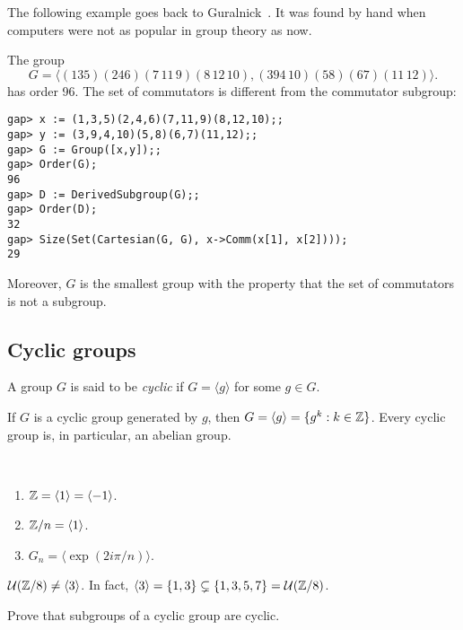 The following example goes back to Guralnick~\cite{MR673806}. 
It was found by hand when computers were not as popular
in group theory as now. 

\begin{example}
The group 
\[
G=\langle (135)(246)(7\,11\,9)(8\,12\,10),(394\,10)(58)(67)(11\,12)\rangle.
\]
has order 96. The set of commutators 
is different from the commutator subgroup:
\begin{lstlisting}
gap> x := (1,3,5)(2,4,6)(7,11,9)(8,12,10);;
gap> y := (3,9,4,10)(5,8)(6,7)(11,12);;
gap> G := Group([x,y]);;
gap> Order(G);
96
gap> D := DerivedSubgroup(G);;
gap> Order(D);
32
gap> Size(Set(Cartesian(G, G), x->Comm(x[1], x[2])));
29
\end{lstlisting}
Moreover, 
$G$ is the smallest group with the property that  
the set of commutators is not a subgroup. 
\end{example}

\subsection{Cyclic groups}

\begin{definition}
        A group $G$ is said to be \emph{cyclic} if 
        $G=\langle g\rangle$ for some 
        $g\in G$.
\end{definition}

If $G$ is a cyclic group generated by $g$, then 
$G=\langle g\rangle=\{g^k:k\in\mathbb{Z}\}$. Every cyclic group is, 
in particular, an abelian group. 

\begin{example}\
\begin{enumerate}
        \item $\mathbb{Z}=\langle 1\rangle=\langle -1\rangle$.
        \item $\mathbb{Z}/n=\langle 1\rangle$.
        \item $G_n=\langle \exp(2i\pi/n)\rangle$.
\end{enumerate}
\end{example}

\begin{example}
        $\mathcal{U}(\mathbb{Z}/8)\ne\langle 3\rangle$. In fact, $\langle 3\rangle=\{1,3\}\subsetneq\{1,3,5,7\}=\mathcal{U}(\mathbb{Z}/8)$.
\end{example}

\begin{exercise}
\label{xca:subgroups_cyclic}
        Prove that subgroups of a cyclic group are cyclic.
\end{exercise}

